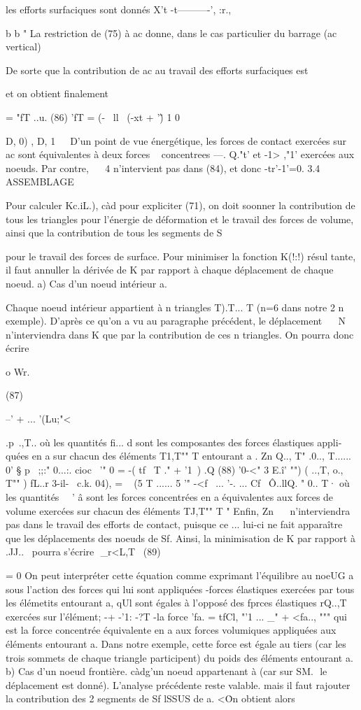{{{{{{{{{{{{{les efforts surfaciques sont donnés 
X't -t----------', :r., 

b
b
" 
La restriction de (75) à ac donne, dans le cas particulier du barrage (ac vertical) 

De sorte que la contribution de ac au travail des efforts surfaciques est 

et on obtient finalement 

= "fT ..u. 
(86) 'fT = (-~ ll~ (-xt + '\~) 1 0 

D, 0)
, D,
1 ­
~ 
D'un point de  vue  énergétique,  les  forces  de  contact  exercées  
sur  ac  sont  équivalentes  à deux  forces  ~ concentrees  ---. Q."t'  et  -1> ,"1'  exercées  
aux  noeuds.  Par contre,  ~~ 4  n'intervient  pas  dans  (84),  et donc  -tr'-1'=0.  
3.4 ASSEMBLAGE  

Pour calculer Kc.iL.), càd pour expliciter (71), on doit soonner la contribution de tous les triangles pour l'énergie de déformation et le 
travail des forces de volume, ainsi que la contribution de tous les segments de S{ pour le travail des forces de surface. Pour minimiser la fonction K(!:!) résul tante, il faut annuller la dérivée de K par rapport à chaque déplacement de chaque noeud. 
a) Cas d'un noeud intérieur a. 

Chaque noeud intérieur appartient à n triangles T).T... T (n=6 dans notre
2 n exemple). D'après ce qu'on a vu au paragraphe précédent, le déplacement ~~ 
N 
n'interviendra dans K que par la contribution de ces n triangles. On pour­ra donc écrire 

o Wr.

(87) 


--' + ... 
'(Lu;"< 

.p~.,T..
où les quantités fi... d sont les composantes des forces élastiques appli­quées en a sur chacun des éléments T1,T"" T entourant a .
Zn 
Q.., T" .0.., T......
0' § p~ ;;:" 0...:. cioc~ '" 0 = -( tf~ T ." + '1\ ) 
.Q
(88) 	'0-<" 3 E.î' "") ( ..,T, o., T"" ) 
fL..r 3-il-~ c.k. 04), = ~ (5 T ...... 5 '" -<f~ ... '-. ... Cf~
Ô..llQ. 
" 
0.. T· 
où les quantités ~~' â sont les forces concentrées en a équivalentes aux forces de volume exercées sur chacun des éléments TJ,T"" T " Enfin,
Zn ~~ n'interviendra pas dans le travail des efforts de contact, puisque ce­
... 
lui-ci ne 	fait apparaître que les déplacements des noeuds de Sf. Ainsi, la minimisation de K par rapport à .JJ..~ pourra s'écrire
 
_r<L,T~
(89) 

= 0 
On peut interpréter cette équation comme exprimant l'équilibre au noeUG a sous l'action des forces qui lui sont appliquées -forces élastiques exercées par tous les élémetits entourant a, qUl sont égales à l'opposé des fprces élastiques rQ..,T~ exercées sur l'élément; -+ -'1: -?T 
-la force 'fa. = tfCl, "'1 ... _" + <fa.., """ qui est la force concentrée équivalente en a aux forces volumiques appliquées aux éléments entourant a. Dans notre exemple, cette force est égale au tiers (car les trois sommets de chaque triangle participent) du poids des éléments entourant a. 
b) Cas d'un noeud frontière. càdg'un noeud appartenant à (car sur SM.
 le déplacement est donné). L'analyse précédente reste valable. mais il 
faut rajouter la contribution des 2 segments de Sf lSSUS de a. <\. 
On obtient alors 

}}}}}}}}}}}}}}
